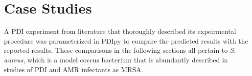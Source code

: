 



\section{Case Studies}
A PDI experiment from literature that thoroughly described its expeirmental procedure was parameterized in PDIpy to compare the predicted results with the reported results. These comparisons in the following sections all pertain to \textit{S. aureus}, which is a model coccus bacterium that is abundantly described in studies of PDI and AMR infectants as MRSA.




